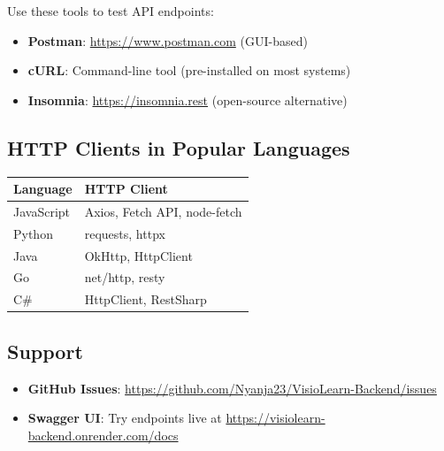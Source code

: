 \documentclass[12pt,a4paper,oneside]{article}
\begin{document}
Use these tools to test API endpoints:

\begin{itemize}
    \item \textbf{Postman}: \url{https://www.postman.com} (GUI-based)
    \item \textbf{cURL}: Command-line tool (pre-installed on most systems)
    \item \textbf{Insomnia}: \url{https://insomnia.rest} (open-source alternative)
\end{itemize}

\subsection{HTTP Clients in Popular Languages}

\begin{table}[H]
\centering
\small
\begin{tabular}{|l|l|}
\hline
\textbf{Language} & \textbf{HTTP Client} \\
\hline
JavaScript & Axios, Fetch API, node-fetch \\
\hline
Python & requests, httpx \\
\hline
Java & OkHttp, HttpClient \\
\hline
Go & net/http, resty \\
\hline
C\# & HttpClient, RestSharp \\
\hline
\end{tabular}
\end{table}

\subsection{Support}

\begin{itemize}
    \item \textbf{GitHub Issues}: \url{https://github.com/Nyanja23/VisioLearn-Backend/issues}
    \item \textbf{Swagger UI}: Try endpoints live at \url{https://visiolearn-backend.onrender.com/docs}
\end{itemize}
\end{document}
